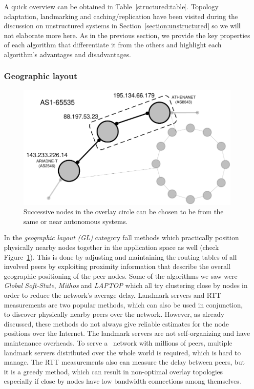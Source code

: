 A quick overview can be obtained in Table~\ref{structured:table}. Topology
adaptation, landmarking and caching/replication have been visited during the
discussion on unstructured systems in Section~\ref{section:unstructured} so
we will not elaborate more here. As in the previous section, we provide the
key properties of each algorithm that differentiate it from the others and
highlight each algorithm's advantages and disadvantages.

\subsubsection{Geographic layout} \label{section:geographic_layout}

\begin{figure}[ht]
\centering
  \includegraphics[scale=0.4]{img/pdf/geographic-layout.pdf}
\caption{Successive nodes in the overlay circle can be chosen to be from the
same or near autonomous systems.}
\label{figure:geographic-layout}
\end{figure}

In the \emph{geographic layout (GL)} category fall methods which practically
position physically nearby nodes together in the application space as well
(check Figure~\ref{figure:geographic-layout}). This is done by adjusting and
maintaining the routing tables of all involved peers by exploiting
proximity information that describe the overall geographic positioning of the
peer nodes. Some of the algorithms we saw were \emph{Global Soft-State},
\emph{Mithos} and \emph{LAPTOP} which all try clustering close by nodes in
order to reduce the network's average delay.
Landmark servers and RTT measurements are two popular methods, which
can also be used in conjunction, to discover physically nearby peers over the
network. However, as already discussed, these
methods do not always give reliable estimates for the node positions over the
Internet. The landmark servers are not self-organizing and have maintenance
overheads. To serve a \p\ network with millions of peers, multiple landmark
servers distributed over the whole world is required, which is hard to manage.
The RTT measurements also can measure the delay between peers, but it is a
greedy method, which can result in non-optimal overlay topologies especially if
close by nodes have low bandwidth connections among themselves.

